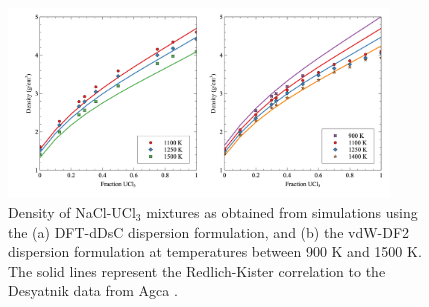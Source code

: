 \documentclass[preprint,3p,10pt,onecolumn,number,sort&compress]{elsarticle}
\begin{document}
{\begin{figure}[htb]
\centering
\includegraphics[width=0.9\textwidth]{fig7.jpg}
\caption{Density of NaCl-UCl$_3$ mixtures as obtained from simulations using the (a) DFT-dDsC dispersion formulation, and (b) the vdW-DF2 dispersion formulation at temperatures between 900 K and 1500 K. The solid lines represent the Redlich-Kister correlation to the Desyatnik \cite{Desyatnik} data from Agca \cite{agca2022}.%
} 
\label{fig:NaClUCl3}
\end{figure}

}
\end{document}
